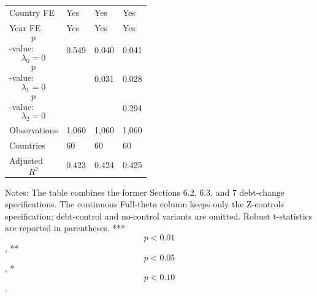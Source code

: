 \begin{table}[H]
\begin{threeparttable}
\begin{tabularx}{\textwidth}{lYYY}
Country FE & Yes & Yes & Yes \\
Year FE & Yes & Yes & Yes \\
$$p$$-value: $$\lambda_0=0$$ & 0.549 & 0.040 & 0.041 \\
$$p$$-value: $$\lambda_1=0$$ &  & 0.031 & 0.028 \\
$$p$$-value: $$\lambda_2=0$$ &  &  & 0.294 \\
Observations & 1,060 & 1,060 & 1,060 \\
Countries & 60 & 60 & 60 \\
Adjusted $$R^2$$ & 0.423 & 0.424 & 0.425 \\
\bottomrule
\end{tabularx}
\begin{tablenotes}[flushleft]\footnotesize
\item Notes: The table combines the former Sections 6.2, 6.3, and 7 debt-change specifications. The continuous Full-theta column keeps only the Z-controls specification; debt-control and no-control variants are omitted. Robust t-statistics are reported in parentheses. *** $$p<0.01$$, ** $$p<0.05$$, * $$p<0.10$$.
\end{tablenotes}
\end{threeparttable}
\end{table}
